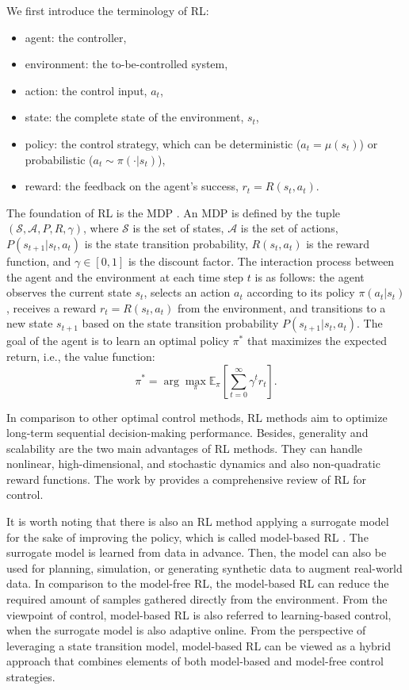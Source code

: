 We first introduce the terminology of \ac{RL}:
\begin{itemize}
\item agent: the controller,
\item environment: the to-be-controlled system,
\item action: the control input, $a_t$,
\item state: the complete state of the environment, $s_t$,
\item policy: the control strategy, which can be deterministic ($a_t=\mu(s_t)$) or probabilistic ($a_t \sim \pi(\cdot|s_t)$),
\item reward: the feedback on the agent's success, $r_t=R(s_t,a_t)$.
\end{itemize}
The foundation of \ac{RL} is the \ac{MDP} \citep{mdp2014}. An \ac{MDP} is defined by the tuple $(\mathcal{S}, \mathcal{A}, P, R, \gamma)$, where $\mathcal{S}$ is the set of states, $\mathcal{A}$ is the set of actions, $P(s_{t+1}|s_t,a_t)$ is the state transition probability, $R(s_t,a_t)$ is the reward function, and $\gamma\in[0,1]$ is the discount factor. The interaction process between the agent and the environment at each time step $t$ is as follows: the agent observes the current state $s_t$, selects an action $a_t$ according to its policy $\pi(a_t|s_t)$, receives a reward $r_t=R(s_t,a_t)$ from the environment, and transitions to a new state $s_{t+1}$ based on the state transition probability $P(s_{t+1}|s_t,a_t)$. The goal of the agent is to learn an optimal policy $\pi^*$ that maximizes the expected return, i.e., the value function:
\begin{equation}
    \pi^* = \arg\max_{\pi} \mathbb{E}_{\pi}\left[\sum_{t=0}^{\infty} \gamma^t r_t\right].
\end{equation}          

In comparison to other optimal control methods, \ac{RL} methods aim to optimize long-term sequential decision-making performance. Besides, generality and scalability are the two main advantages of \ac{RL} methods. They can handle nonlinear, high-dimensional, and stochastic dynamics and also non-quadratic reward functions. The work by \citeauthor{rlforcontrol2018} \citeyearpar{rlforcontrol2018} provides a comprehensive review of \ac{RL} for control. 

It is worth noting that there is also an \ac{RL} method applying a surrogate model for the sake of improving the policy, which is called model-based \ac{RL} \citep{sutton1990, mbrl2020}. The surrogate model is learned from data in advance. Then, the model can also be used for planning, simulation, or generating synthetic data to augment real-world data. In comparison to the model-free \ac{RL}, the model-based \ac{RL} can reduce the required amount of samples gathered directly from the environment. From the viewpoint of control, model-based \ac{RL} is also referred to learning-based control, when the surrogate model is also adaptive online. From the perspective of leveraging a state transition model, model-based \ac{RL} can be viewed as a hybrid approach that combines elements of both model-based and model-free control strategies.

